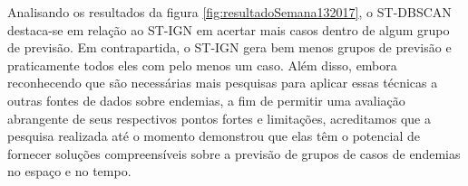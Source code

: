 Analisando os resultados da figura \ref{fig:resultadoSemana132017}, o \acrshort{ST-DBSCAN} destaca-se em relação ao ST-IGN em acertar mais casos dentro de algum grupo de previsão. Em contrapartida, o ST-IGN gera bem menos grupos de previsão e praticamente todos eles com pelo menos um caso.
Além disso, embora reconhecendo que são necessárias mais pesquisas para aplicar essas técnicas a outras fontes de dados sobre endemias, a fim de permitir uma avaliação abrangente de seus respectivos pontos fortes e limitações, acreditamos que a pesquisa realizada até o momento demonstrou que elas têm o potencial de fornecer soluções compreensíveis sobre a previsão de grupos de casos de endemias no espaço e no tempo.

\begin{figure}[!ht]
	\centering	
\end{figure}
\FloatBarrier






